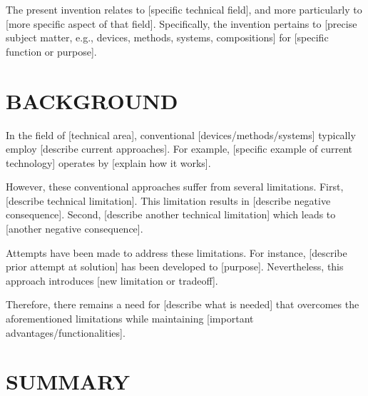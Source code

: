 \documentclass[12pt,letterpaper]{article}
\begin{document}
The present invention relates to [specific technical field], and more particularly to [more specific aspect of that field]. Specifically, the invention pertains to [precise subject matter, e.g., devices, methods, systems, compositions] for [specific function or purpose].

\section*{BACKGROUND}


In the field of [technical area], conventional [devices/methods/systems] typically employ [describe current approaches]. For example, [specific example of current technology] operates by [explain how it works].

However, these conventional approaches suffer from several limitations. First, [describe technical limitation]. This limitation results in [describe negative consequence]. Second, [describe another technical limitation] which leads to [another negative consequence].

Attempts have been made to address these limitations. For instance, [describe prior attempt at solution] has been developed to [purpose]. Nevertheless, this approach introduces [new limitation or tradeoff].

Therefore, there remains a need for [describe what is needed] that overcomes the aforementioned limitations while maintaining [important advantages/functionalities].

\section*{SUMMARY}

\end{document}
